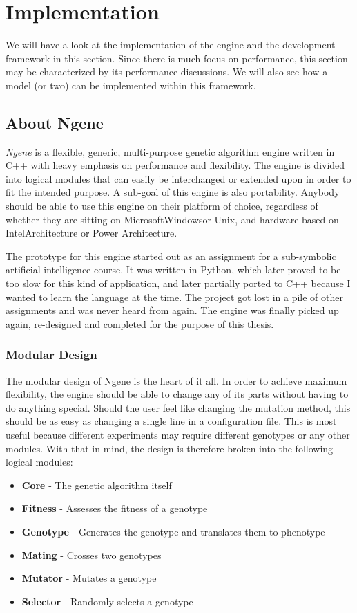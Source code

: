 \section{Implementation}
\label{sec:implementation}
We will have a look at the implementation of the engine and the development framework in this section. Since there is much focus on performance, this section may be characterized by its performance discussions. We will also see how a model (or two) can be implemented within this framework.


\subsection{About Ngene}
\emph{Ngene} is a flexible, generic, multi-purpose genetic algorithm engine written in C++ with heavy emphasis on performance and flexibility. The engine is divided into logical modules that can easily be interchanged or extended upon in order to fit the intended purpose. A sub-goal of this engine is also portability. Anybody should be able to use this engine on their platform of choice, regardless of whether they are sitting on Microsoft\textregistered Windows\texttrademark or Unix, and hardware based on Intel\textregistered Architecture or Power Architecture.

The prototype for this engine started out as an assignment for a sub-symbolic artificial intelligence course. It was written in Python, which later proved to be too slow for this kind of application, and later partially ported to C++ because I wanted to learn the language at the time. The project got lost in a pile of other assignments and was never heard from again. The engine was finally picked up again, re-designed and completed for the purpose of this thesis.

\subsubsection{Modular Design}
The modular design of Ngene is the heart of it all. In order to achieve maximum flexibility, the engine should be able to change any of its parts without having to do anything special. Should the user feel like changing the mutation method, this should be as easy as changing a single line in a configuration file. This is most useful because different experiments may require different genotypes or any other modules. With that in mind, the design is therefore broken into the following logical modules:

\begin{itemize}
	\itemsep=0pt
	\item\textbf{Core} - The genetic algorithm itself
	\item\textbf{Fitness} - Assesses the fitness of a genotype
	\item\textbf{Genotype} - Generates the genotype and translates them to phenotype
	\item\textbf{Mating} - Crosses two genotypes
	\item\textbf{Mutator} - Mutates a genotype
	\item\textbf{Selector} - Randomly selects a genotype
\end{itemize}


